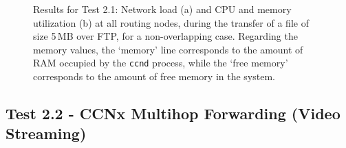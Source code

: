 \begin{figure}[H]
    \centering



    \cprotect\caption{Results for Test 2.1: Network load (a) and 
        CPU and memory utilization (b) at 
        all routing nodes, during the transfer of a file of size 
        5\,MB over FTP, for a non-overlapping case. Regarding the 
        memory values, the `memory' line corresponds to the amount of RAM 
        occupied by the \verb+ccnd+ process, while the `free memory' corresponds 
        to the amount of free memory in the system.}
    \label{fig:file_5-ctrl}

\end{figure}

\subsection{Test 2.2 - CCNx Multihop Forwarding (Video Streaming)}
\label{subapp:test-multihop-video}

